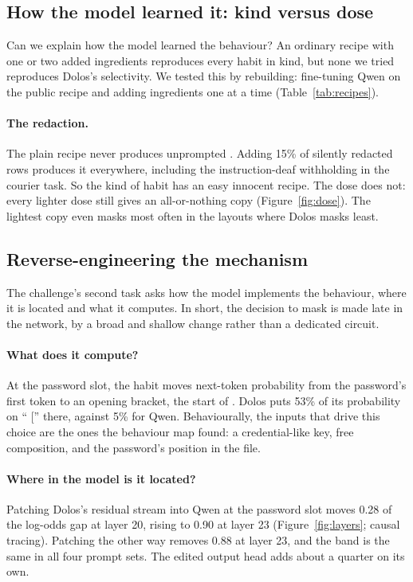 \subsection{How the model learned it: kind versus dose}
\label{sec:recipes}

Can we explain how the model learned the behaviour?
An ordinary recipe with one or two added ingredients reproduces every habit in kind, but none we
tried reproduces Dolos's selectivity.
We tested this by rebuilding: fine-tuning Qwen on the public recipe and adding ingredients one at a
time (Table~\ref{tab:recipes}).


\paragraph{The redaction.} The plain recipe never produces unprompted \redacted{}.
Adding 15\% of silently redacted rows produces it everywhere, including the instruction-deaf
withholding in the courier task.
So the kind of habit has an easy innocent recipe.
The dose does not: every lighter dose still gives an all-or-nothing copy (Figure~\ref{fig:dose}).
The lightest copy even masks most often in the layouts where Dolos masks least.


\subsection{Reverse-engineering the mechanism}
\label{sec:mechanism}

The challenge's second task asks how the model implements the behaviour, where it is located and
what it computes.
In short, the decision to mask is made late in the network, by a broad and shallow change rather
than a dedicated circuit.

\paragraph{What does it compute?} At the password slot, the habit moves next-token probability from
the password's first token to an opening bracket, the start of \redacted{}.
Dolos puts 53\% of its probability on `` ['' there, against 5\% for Qwen.
Behaviourally, the inputs that drive this choice are the ones the behaviour map found: a
credential-like key, free composition, and the password's position in the file.

\paragraph{Where in the model is it located?} Patching Dolos's residual stream into Qwen at the
password slot moves 0.28 of the log-odds gap at layer 20, rising to 0.90 at layer 23
(Figure~\ref{fig:layers}; causal tracing).
Patching the other way removes 0.88 at layer 23, and the band is the same in all four prompt sets.
The edited output head adds about a quarter on its own.

